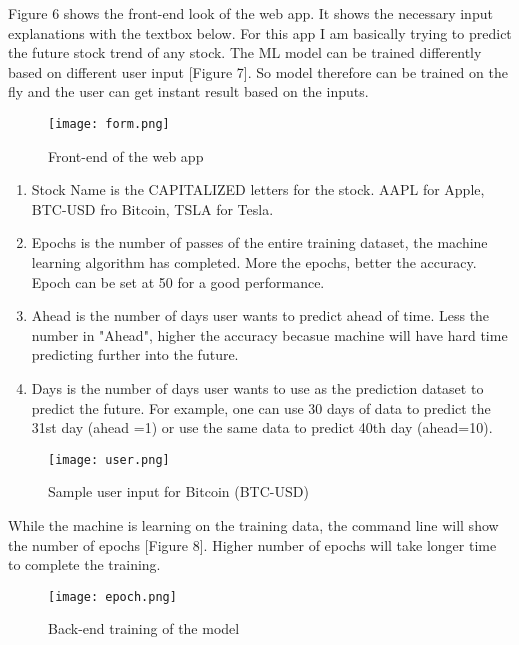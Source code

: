 \documentclass[11pt]{diazessay} %
\begin{document}
Figure 6 shows the front-end look of the web app. It shows the necessary input explanations with the textbox below. For this app I am basically trying to predict the future stock trend of any stock. The ML model can be trained differently based on different user input [Figure 7]. So model therefore can be trained on the fly and the user can get instant result based on the inputs.

\begin{figure}[!h]
\begin{center}
\texttt{[image: form.png]}
\caption{Front-end of the web app}
\end{center}
\end{figure}

\begin{enumerate}
	\item Stock Name is the CAPITALIZED letters for the stock. AAPL for Apple, BTC-USD fro Bitcoin, TSLA for Tesla.
	\item Epochs is the number of passes of the entire training dataset, the machine learning algorithm has completed. More the epochs, better the accuracy. Epoch can be set at 50 for a good performance.
	\item Ahead is the number of days user wants to predict ahead of time. Less the number in "Ahead", higher the accuracy becasue machine will have hard time predicting further into the future.
	\item Days is the number of days user wants to use as the prediction dataset to predict the future. For example, one can use 30 days of data to predict the 31st day (ahead =1) or use the same data to predict 40th day (ahead=10).
\end{enumerate}


\begin{figure}[!h]
\begin{center}
\texttt{[image: user.png]} %
\caption{Sample user input for Bitcoin (BTC-USD)}
\end{center}
\end{figure}

While the machine is learning on the training data, the command line will show the number of epochs [Figure 8]. Higher number of epochs will take longer time to complete the training.

\begin{figure}[!h]
\begin{center}
\texttt{[image: epoch.png]} %
\caption{Back-end training of the model}
\end{center}
\end{figure}
\end{document}
